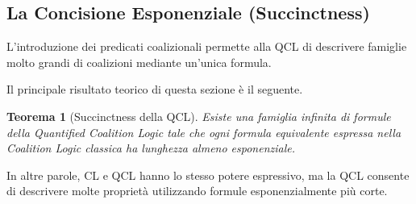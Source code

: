 \documentclass[12pt]{article}
\newtheorem{theorem}{Teorema}[section]
\begin{document}
\subsection{La Concisione Esponenziale (Succinctness)}

L'introduzione dei predicati coalizionali permette alla QCL di descrivere
famiglie molto grandi di coalizioni mediante un'unica formula.

Il principale risultato teorico di questa sezione è il seguente.

\begin{theorem}[Succinctness della QCL]
	Esiste una famiglia infinita di formule della Quantified Coalition Logic
	tale che ogni formula equivalente espressa nella Coalition Logic classica
	ha lunghezza almeno esponenziale.
\end{theorem}

In altre parole, CL e QCL hanno lo stesso potere espressivo, ma la QCL
consente di descrivere molte proprietà utilizzando formule
esponenzialmente più corte.
\end{document}
